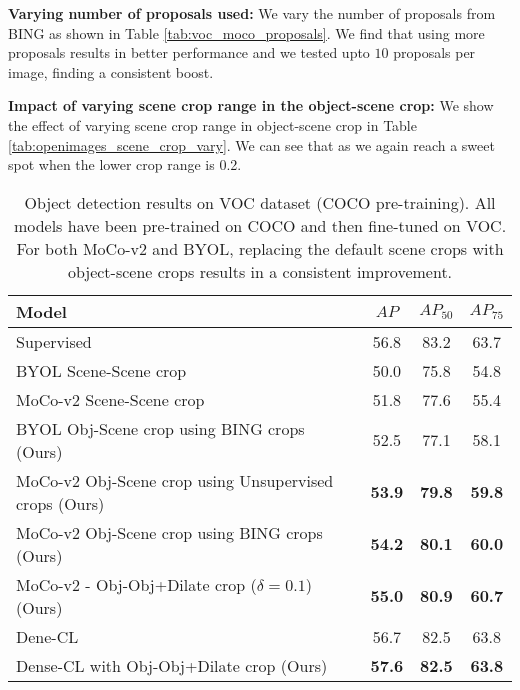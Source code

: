 \textbf{Varying number of proposals used:} We vary the number of proposals from BING as shown in Table \ref{tab:voc_moco_proposals}. We find that using more proposals results in better performance and we tested upto $10$ proposals per image, finding a consistent boost.


\textbf{Impact of varying scene crop range in the object-scene crop:} We show the effect of varying scene crop range in object-scene crop in Table \ref{tab:openimages_scene_crop_vary}. We can see that as we again reach a sweet spot when the lower crop range is 0.2.


\begin{table*}
    \centering
    \begin{tabu} to \linewidth {lccc} 
        \toprule
        Model & $AP$ & $AP_{50}$ & $AP_{75}$ \\
         \midrule
    Supervised & 56.8 & 83.2 & 63.7 \\
     \midrule
    BYOL Scene-Scene crop \citep{grill2020bootstrap}  & 50.0 & 75.8 & 54.8\\
    MoCo-v2 Scene-Scene crop \citep{chen2020improved}  & 51.8 & 77.6 & 55.4\\
    
    \midrule
    BYOL Obj-Scene crop using BING crops (Ours)  & 52.5 & 77.1 & 58.1\\
    MoCo-v2 Obj-Scene crop using Unsupervised crops (Ours)  &  \textbf{53.9} &  \textbf{79.8} & \textbf{59.8}\\
    MoCo-v2 Obj-Scene crop using BING crops (Ours)  &  \textbf{54.2} &  \textbf{80.1} & \textbf{60.0}\\
    MoCo-v2 - Obj-Obj+Dilate  crop ($\delta=0.1$) (Ours) &  \textbf{55.0} &  \textbf{80.9} & \textbf{60.7}\\
    \midrule
    Dene-CL \citep{wang2021dense}  & 56.7 & 82.5 & 63.8\\
    Dense-CL with Obj-Obj+Dilate crop (Ours)  &  \textbf{57.6} &  \textbf{82.5} & \textbf{63.8}\\
        \bottomrule
    \end{tabu}
    \caption{Object detection results on VOC dataset (COCO pre-training). All models have been pre-trained on COCO and then fine-tuned on VOC. For both MoCo-v2 and BYOL, replacing the default scene crops with object-scene crops results in a consistent improvement. }
    \label{tab:voc_moco}
    
\end{table*}


